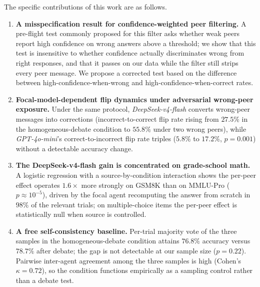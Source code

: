 \documentclass[review,3p,authoryear]{elsarticle}
\begin{document}
The specific contributions of this work are as follows.
\begin{enumerate}
    \item \textbf{A misspecification result for confidence-weighted
          peer filtering.} A pre-flight test commonly proposed for
          this filter asks whether weak peers report high confidence
          on wrong answers above a threshold; we show that this test
          is insensitive to whether confidence actually discriminates
          wrong from right responses, and that it passes on our data
          while the filter still strips every peer message.
          We propose a corrected test based on the difference between
          high-confidence-when-wrong and high-confidence-when-correct
          rates.
    \item \textbf{Focal-model-dependent flip dynamics under adversarial
          wrong-peer exposure.} Under the same protocol,
          \textit{DeepSeek-v4-flash} converts wrong-peer messages
          into corrections (incorrect-to-correct flip rate rising
          from $27.5\%$ in the homogeneous-debate condition to
          $55.8\%$ under two wrong peers), while
          \textit{GPT-4o-mini}'s correct-to-incorrect flip rate
          triples ($5.8\%$ to $17.2\%$, $p = 0.001$) without a
          detectable accuracy change.
    \item \textbf{The DeepSeek-v4-flash gain is concentrated on
          grade-school math.} A logistic regression with a
          source-by-condition interaction shows the per-peer effect
          operates $1.6\times$ more strongly on GSM8K than on
          MMLU-Pro ($p \approx 10^{-5}$), driven by the focal agent
          recomputing the answer from scratch in $98\%$ of the
          relevant trials; on multiple-choice items the per-peer
          effect is statistically null when source is controlled.
    \item \textbf{A free self-consistency baseline.}
          Per-trial majority vote of the three samples in the
          homogeneous-debate condition attains $76.8\%$ accuracy
          versus $78.7\%$ after debate; the gap is not detectable at
          our sample size ($p = 0.22$).
          Pairwise inter-agent agreement among the three samples is
          high (Cohen's $\kappa = 0.72$), so the condition functions
          empirically as a sampling control rather than a debate
          test.
\end{enumerate}

\end{document}
